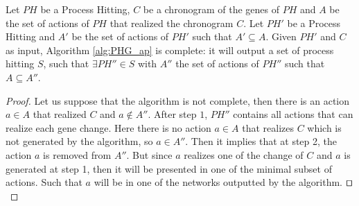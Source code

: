 %

\begin{theorem}[Completeness]%
	\label{th:correct}
	Let $PH$ be a Process Hitting, $C$ be a chronogram of the genes of $PH$ and $A$ be the set of actions of $PH$ that realized the chronogram $C$.
	Let $PH'$ be a Process Hitting and $A'$ be the set of actions of $PH'$ such that $A' \subseteq A$.
	Given $PH'$ and $C$ as input, Algorithm \ref{alg:PHG_ap} is complete:
	it will output a set of process hitting $S$,
	such that $\exists PH'' \in S$ with $A''$ the set of actions of $PH''$ such that $A \subseteq A''$.
	\begin{proof}
	Let us suppose that the algorithm is not complete, then there is an action $a \in A$ that realized $C$ and $a \not \in A''$.
	After step $1$, $PH''$ contains all actions that can realize each gene change.
	Here there is no action $a \in A$ that realizes $C$ which is not generated by the algorithm, so $a \in A''$.
	Then it implies that at step 2, the action $a$ is removed from $A''$.
	But since $a$ realizes one of the change of $C$ and $a$ is generated at step 1, then it will be presented in one of the minimal subset of actions.
	Such that $a$ will be in one of the networks outputted by the algorithm.
	$\qed$
	\end{proof}
\end{theorem}


